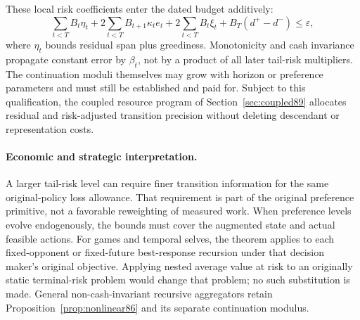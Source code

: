 These local risk coefficients enter the dated budget additively:
\begin{equation}\label{eq:risk-budget91}
 \sum_{t<T}B_t\eta_t
 +2\sum_{t<T}B_{t+1}\kappa_t e_t
 +2\sum_{t<T}B_t\xi_t+B_T(d^+-d^-)\le\varepsilon,
\end{equation}
where $\eta_t$ bounds residual span plus greediness. Monotonicity and cash invariance propagate constant error by $\beta_t$, not by a product of all later tail-risk multipliers. The continuation moduli themselves may grow with horizon or preference parameters and must still be established and paid for. Subject to this qualification, the coupled resource program of Section~\ref{sec:coupled89} allocates residual and risk-adjusted transition precision without deleting descendant or representation costs.

\paragraph{Economic and strategic interpretation.}
A larger tail-risk level can require finer transition information for the same original-policy loss allowance. That requirement is part of the original preference primitive, not a favorable reweighting of measured work. When preference levels evolve endogenously, the bounds must cover the augmented state and actual feasible actions. For games and temporal selves, the theorem applies to each fixed-opponent or fixed-future best-response recursion under that decision maker's original objective. Applying nested average value at risk to an originally static terminal-risk problem would change that problem; no such substitution is made. General non-cash-invariant recursive aggregators retain Proposition~\ref{prop:nonlinear86} and its separate continuation modulus.
